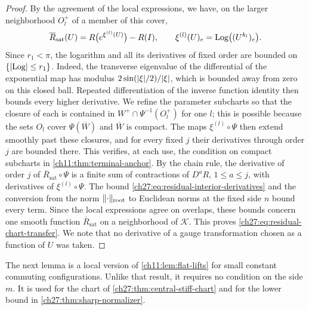 \begin{proof}
By the agreement of the local expressions, we have, on the larger neighborhood $O_l^+$ of a member of this cover,
\[
 \overline R_{\mathrm{sat}}(U)=R\bigl(e^{\xi^{(l)}(U)}\bigr)-R(I),\qquad\xi^{(l)}(U)_e=\operatorname{Log}\bigl((U^{k_l})_e\bigr).
\]
Since $r_1<\pi$, the logarithm and all its derivatives of fixed order are bounded on $\{\lvert \operatorname{Log}\rvert\le r_1\}$. Indeed, the transverse eigenvalue of the differential of the exponential map has modulus $2\sin(\lvert \xi\rvert/2)/\lvert \xi\rvert$, which is bounded away from zero on this closed ball. Repeated differentiation of the inverse function identity then bounds every higher derivative. We refine the parameter subcharts so that the closure of each is contained in $W^+\cap\Psi^{-1}(O_l^+)$ for one $l$; this is possible because the sets $O_l$ cover $\Psi(\overline W)$ and $\overline W$ is compact. The maps $\xi^{(l)}\circ\Psi$ then extend smoothly past these closures, and for every fixed $j$ their derivatives through order $j$ are bounded there. This verifies, at each use, the condition on compact subcharts in \cref{ch11:thm:terminal-anchor}. By the chain rule, the derivative of order $j$ of $\overline R_{\mathrm{sat}}\circ\Psi$ is a finite sum of contractions of $D^aR$, $1\le a\le j$, with derivatives of $\xi^{(l)}\circ\Psi$. The bound \eqref{ch27:eq:residual-interior-derivatives} and the conversion from the norm $\lVert \cdot\rVert_{\mathrm{root}}$ to Euclidean norms at the fixed side $n$ bound every term. Since the local expressions agree on overlaps, these bounds concern one smooth function $\overline R_{\mathrm{sat}}$ on a neighborhood of $\mathcal K$. This proves \eqref{ch27:eq:residual-chart-transfer}. We note that no derivative of a gauge transformation chosen as a function of $U$ was taken.
\end{proof}

The next lemma is a local version of \cref{ch11:lem:flat-lifts} for small constant commuting configurations. Unlike that result, it requires no condition on the side $m$. It is used for the chart of \cref{ch27:thm:central-stiff-chart} and for the lower bound in \cref{ch27:thm:sharp-normalizer}.


